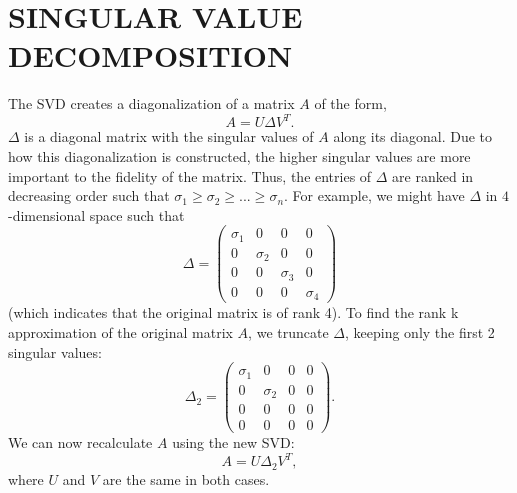 \documentclass[a4paper,twoside]{article}
\begin{document}
\section{\uppercase{Singular Value Decomposition}}
\label{sec:svd}
\noindent The SVD creates a diagonalization of a matrix $A$ of the form, $$A = U\Delta V^T.$$ $\Delta$ is a diagonal matrix with the singular values of $A$ along its diagonal. Due to how this diagonalization is constructed, the higher singular values are more important to the fidelity of the matrix. Thus, the entries of $\Delta$ are ranked in decreasing order such that $\sigma_1 \ge{\sigma_2}\ge{...}\ge{\sigma_n}$. For example, we might have $\Delta$ in $4$-dimensional space such that $$\Delta = \begin{pmatrix}\sigma_1 & 0 & 0 & 0\\0 & \sigma_2 & 0 &0\\0&0&\sigma_3&0\\0&0&0&\sigma_4\end{pmatrix}$$ (which indicates that the original matrix is of rank 4). To find the rank k approximation of the original matrix $A$, we truncate $\Delta$, keeping only the first 2 singular values: $$\Delta_2 = \begin{pmatrix}\sigma_1 & 0 & 0 & 0\\0 & \sigma_2 & 0 &0\\0&0&0&0\\0&0&0&0\end{pmatrix}.$$ We can now recalculate $A$ using the new SVD: $$A = U\Delta_2 V^T,$$ where $U$ and $V$ are the same in both cases.
\end{document}
